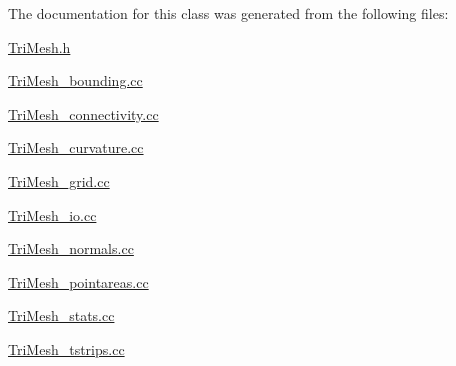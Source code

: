 The documentation for this class was generated from the following files\+:\begin{DoxyCompactItemize}
\item 
\hyperlink{TriMesh_8h}{Tri\+Mesh.\+h}\item 
\hyperlink{TriMesh__bounding_8cc}{Tri\+Mesh\+\_\+bounding.\+cc}\item 
\hyperlink{TriMesh__connectivity_8cc}{Tri\+Mesh\+\_\+connectivity.\+cc}\item 
\hyperlink{TriMesh__curvature_8cc}{Tri\+Mesh\+\_\+curvature.\+cc}\item 
\hyperlink{TriMesh__grid_8cc}{Tri\+Mesh\+\_\+grid.\+cc}\item 
\hyperlink{TriMesh__io_8cc}{Tri\+Mesh\+\_\+io.\+cc}\item 
\hyperlink{TriMesh__normals_8cc}{Tri\+Mesh\+\_\+normals.\+cc}\item 
\hyperlink{TriMesh__pointareas_8cc}{Tri\+Mesh\+\_\+pointareas.\+cc}\item 
\hyperlink{TriMesh__stats_8cc}{Tri\+Mesh\+\_\+stats.\+cc}\item 
\hyperlink{TriMesh__tstrips_8cc}{Tri\+Mesh\+\_\+tstrips.\+cc}\end{DoxyCompactItemize}
